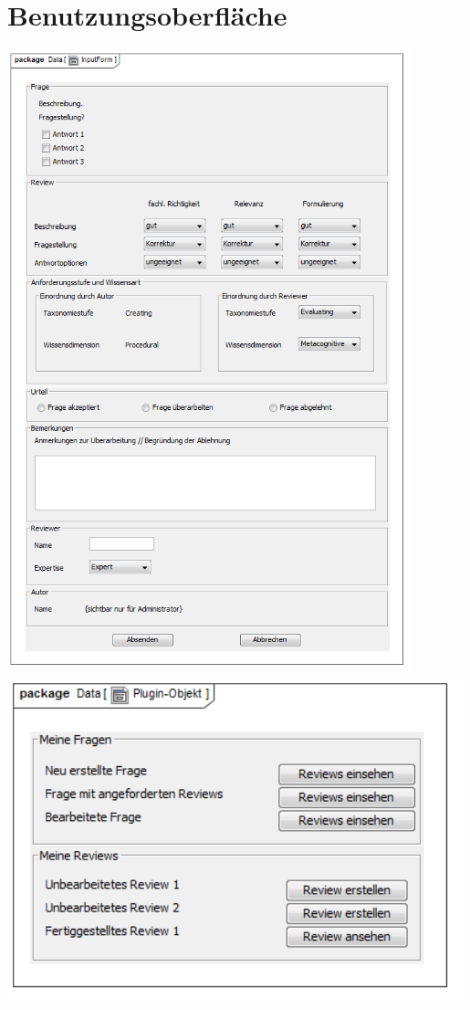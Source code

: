 \documentclass[a4paper]{scrreprt}
\begin{document}
\section{Benutzungsoberfläche}
\centering
\includegraphics[width=0.88\textwidth]{User_Interface_Modeling_Diagram__InputForm.png}
\label{Grafische Benutzeroberfläche}\newpage
\includegraphics[width=0.99\textwidth]{User_Interface_Modeling_Diagram__Plugin-Objekt.png}
\end{document}

